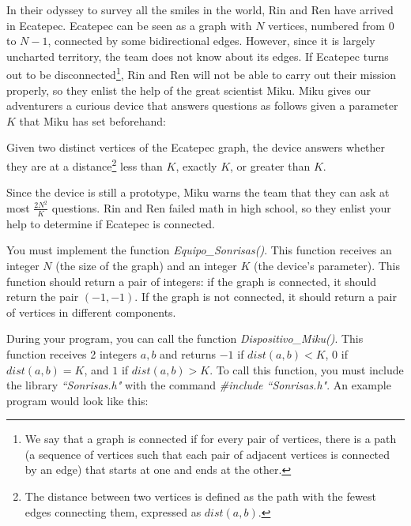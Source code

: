 \documentclass[12pt]{scrartcl}
\begin{document}

    \vspace{10pt}


        In their odyssey to survey all the smiles in the world, Rin and Ren have arrived in Ecatepec. Ecatepec can be seen as a graph with $N$ vertices, numbered from $0$ to $N - 1$, connected by some bidirectional edges. However, since it is largely uncharted territory, the team does not know about its edges. If Ecatepec turns out to be disconnected\footnote{We say that a graph is connected if for every pair of vertices, there is a path (a sequence of vertices such that each pair of adjacent vertices is connected by an edge) that starts at one and ends at the other.}, Rin and Ren will not be able to carry out their mission properly, so they enlist the help of the great scientist Miku. Miku gives our adventurers a curious device that answers questions as follows given a parameter $K$ that Miku has set beforehand:

        Given two distinct vertices of the Ecatepec graph, the device answers whether they are at a distance\footnote{The distance between two vertices is defined as the path with the fewest edges connecting them, expressed as $dist(a, b)$.} less than $K$, exactly $K$, or greater than $K$.

        Since the device is still a prototype, Miku warns the team that they can ask at most $\frac{2N^2}{K}$ questions. Rin and Ren failed math in high school, so they enlist your help to determine if Ecatepec is connected.
        


        You must implement the function \textit{Equipo\_Sonrisas()}. This function receives an integer $N$ (the size of the graph) and an integer $K$ (the device's parameter). This function should return a pair of integers: if the graph is connected, it should return the pair $(-1, -1)$. If the graph is not connected, it should return a pair of vertices in different components. 
        
        During your program, you can call the function \textit{Dispositivo\_Miku()}. This function receives 2 integers $a, b$ and returns $-1$ if $dist(a, b) < K$, $0$ if $dist(a, b) = K$, and $1$ if $dist(a, b) > K$.
        To call this function, you must include the library \textit{``Sonrisas.h"} with the command \textit{\#include ``Sonrisas.h"}.
        An example program would look like this:
\end{document}
